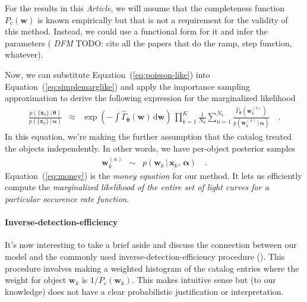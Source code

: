 \documentclass[12pt,preprint]{aastex}
\newcommand{\paper}{\textsl{Article}}
\newcommand{\Eq}[1]{Equation~(\ref{eq:#1})}
\newcommand{\eq}[1]{\Eq{#1}}
\newcommand{\eqlabel}[1]{\label{eq:#1}}
\newcommand{\dd}{\ensuremath{\,\mathrm{d}}}
\newcommand{\bvec}[1]{\ensuremath{\boldsymbol{#1}}}
\newcommand{\todo}[3]{{\color{#2} \emph{#1} TODO: #3}}
\newcommand{\dfmtodo}[1]{\todo{DFM}{red}{#1}}
\newcommand{\rate}{\ensuremath{\Gamma}}
\newcommand{\ratepar}{{\ensuremath{\theta}}}
\newcommand{\ratepars}{{\ensuremath{\bvec{\ratepar}}}}
\newcommand{\obs}[1]{\ensuremath{\hat{#1}}}
\newcommand{\completeness}{{\ensuremath{P_\mathrm{c}}}}
\newcommand{\data}{{\ensuremath{\bvec{x}}}}
\newcommand{\entry}{{\ensuremath{\bvec{w}}}}
\newcommand{\interim}{{\ensuremath{\bvec{\alpha}}}}
\begin{document}
For the results in this \paper, we will assume that the completeness function
$\completeness(\entry)$ is known empirically but that is not a requirement for
the validity of this method.
Instead, we could use a functional form for it and infer the parameters
(\dfmtodo{cite all the papers that do the ramp, step function, whatever}).

Now, we can substitute \eq{poisson-like} into \eq{simplemarglike} and apply
the importance sampling approximation to derive the following expression for
the marginalized likelihood
\begin{eqnarray}\eqlabel{money}
\frac{p(\{\data_k\}\,|\,\ratepars)}{p(\{\data_k\}\,|\,\interim)} &\approx&
    \exp\left(-\int \obs{\rate}_\ratepars (\entry) \dd\entry\right) \,
    \prod_{k=1}^K
    \frac{1}{N_k} \sum_{n=1}^{N_k}
    \frac{\obs{\rate}_\ratepars (\entry_k^{(n)})}
         {p(\entry_k^{(n)}\,|\,\interim)} \quad.
\end{eqnarray}
In this equation, we're making the further assumption that the catalog treated
the objects independently.
In other words, we have per-object posterior samples
\begin{eqnarray}
\entry_k^{(n)} &\sim& p(\entry_k\,|\,\data_k,\,\interim) \quad.
\end{eqnarray}
\Eq{money} is the \emph{money equation} for our method.
It lets us efficiently compute the \emph{marginalized likelihood of the entire
set of light curves for a particular occurence rate function}.

\paragraph{Inverse-detection-efficiency}
It's now interesting to take a brief aside and discuss the connection between
our model and the commonly used inverse-detection-efficiency procedure
(\citealt{howard,dressing,petigura}).
This procedure involves making a weighted histogram of the catalog entries
where the weight for object $\entry_k$ is $1/\completeness(\entry_k)$.
This makes intuitive sense but (to our knowledge) does not have a clear
probabilistic justification or interpretation.
\end{document}
